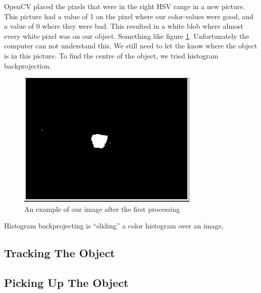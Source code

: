 OpenCV placed the pixels that were in the right HSV range in a new picture. This picture had a value of 1 on the pixel where our color-values were good, and a value of 0 where they were bad. This resulted in a white blob where almost every white pixel was on our object. Something like figure \ref{processed}. Unfortunately the computer can not understand this. We still need to let the \Ardrone know where the object is in this picture. To find the centre of the object, we tried histogram backprojection.

\begin{figure}
  \centering
      \includegraphics{processedImage.png}
  \caption{An example of our image after the first processing}
  \label{processed}
\end{figure}

Histogram backprojecting is ``sliding'' a color histogram over an image, 


\subsection{Tracking The Object}

\subsection{Picking Up The Object}

